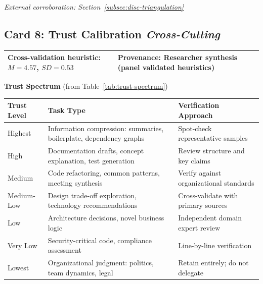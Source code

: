 \vspace{0.5em}
\textit{External corroboration: Section~\ref{subsec:disc-triangulation}}

\clearpage
\subsection*{Card 8: Trust Calibration \hfill \textit{Cross-Cutting}}

\begin{tabular}{|p{7cm}|p{6cm}|}
    \hline
    \textbf{Cross-validation heuristic:} $M = 4.57$, $SD = 0.53$ & \textbf{Provenance:} Researcher synthesis (panel validated heuristics) \\
    \hline
\end{tabular}

\vspace{0.5em}
\textbf{Trust Spectrum} (from Table~\ref{tab:trust-spectrum})

\begin{tabular}{|p{2.5cm}|p{5cm}|p{5cm}|}
    \hline
    \textbf{Trust Level} & \textbf{Task Type} & \textbf{Verification Approach} \\
    \hline
    Highest & Information compression: summaries, boilerplate, dependency graphs & Spot-check representative samples \\
    \hline
    High & Documentation drafts, concept explanation, test generation & Review structure and key claims \\
    \hline
    Medium & Code refactoring, common patterns, meeting synthesis & Verify against organizational standards \\
    \hline
    Medium-Low & Design trade-off exploration, technology recommendations & Cross-validate with primary sources \\
    \hline
    Low & Architecture decisions, novel business logic & Independent domain expert review \\
    \hline
    Very Low & Security-critical code, compliance assessment & Line-by-line verification \\
    \hline
    Lowest & Organizational judgment: politics, team dynamics, legal & Retain entirely; do not delegate \\
    \hline
\end{tabular}

